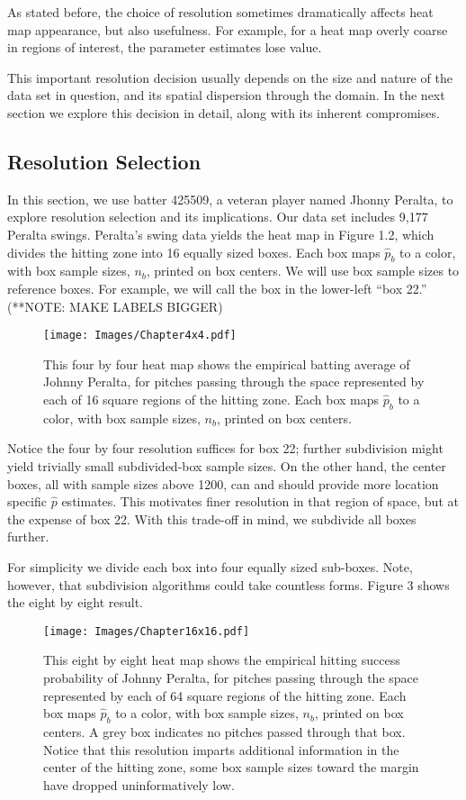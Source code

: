 As stated before, the choice of resolution sometimes dramatically affects heat map appearance, but also usefulness. For example, for a heat map overly coarse in regions of interest, the parameter estimates lose value. 

This important resolution decision usually depends on the size and nature of the data set in question, and its spatial dispersion through the domain. In the next section we explore this decision in detail, along with its inherent compromises.

\subsection{Resolution Selection}

In this section, we use batter 425509, a veteran player named Jhonny Peralta, to explore resolution selection and its implications. Our data set includes 9,177 Peralta swings. Peralta's swing data yields the heat map in Figure 1.2, which divides the hitting zone into 16 equally sized boxes. Each box maps $\hat{p}_{b}$ to a color, with box sample sizes, $n_{b}$, printed on box centers. We will use box sample sizes to reference boxes. For example, we will call the box in the lower-left ``box 22.'' (**NOTE: MAKE LABELS BIGGER)
        \begin{figure}[H]
      	\centering
      	\texttt{[image: Images/Chapter4x4.pdf]} 
      	\caption{This four by four heat map shows the empirical batting average of Johnny Peralta, for pitches passing through the space represented by each of 16 square regions of the hitting zone. Each box maps $\hat{p}_{b}$ to a color, with box sample sizes, $n_{b}$, printed on box centers.}
      	\end{figure} 

Notice the four by four resolution suffices for box 22; further subdivision might yield trivially small subdivided-box sample sizes. On the other hand, the center boxes, all with sample sizes above 1200, can and should provide more location specific $\hat{p}$ estimates. This motivates finer resolution in that region of space, but at the expense of box 22. With this trade-off in mind, we subdivide all boxes further. 

For simplicity we divide each box into four equally sized sub-boxes. Note, however, that subdivision algorithms could take countless forms. Figure 3 shows the eight by eight result.
        \begin{figure}[H]
      	\centering
      	\texttt{[image: Images/Chapter16x16.pdf]} 
      	\caption{This eight by eight heat map shows the empirical hitting success probability of Johnny Peralta, for pitches passing through the space represented by each of 64 square regions of the hitting zone. Each box maps $\hat{p}_{b}$ to a color, with box sample sizes, $n_{b}$, printed on box centers. A grey box indicates no pitches passed through that box. Notice that this resolution imparts additional information in the center of the hitting zone, some box sample sizes toward the margin have dropped uninformatively low.}
      	\end{figure} 


